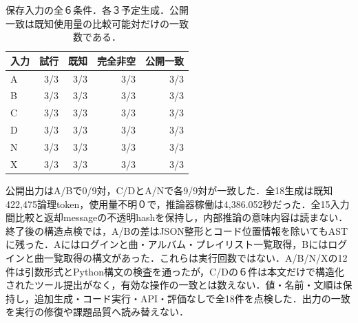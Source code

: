 \begin{table}[tb]
\centering\footnotesize\setlength{\tabcolsep}{3pt}
\caption{保存入力の全６条件．各３予定生成．公開一致は既知使用量の比較可能対だけの一致数である．}
\begin{tabular}{lrrrr}
入力 & 試行 & 既知 & 完全非空 & 公開一致 \\ \hline
A & 3/3 & 3/3 & 3/3 & 3/3 \\
B & 3/3 & 3/3 & 3/3 & 3/3 \\
C & 3/3 & 3/3 & 3/3 & 3/3 \\
D & 3/3 & 3/3 & 3/3 & 3/3 \\
N & 3/3 & 3/3 & 3/3 & 3/3 \\
X & 3/3 & 3/3 & 3/3 & 3/3 \\
\hline\end{tabular}
\end{table}
公開出力はA/Bで0/9対，C/DとA/Nで各9/9対が一致した．全18生成は既知422,475論理token，使用量不明０で，推論器稼働は4,386.052秒だった．全15入力間比較と返却messageの不透明hashを保持し，内部推論の意味内容は読まない．
終了後の構造点検では，A/Bの差はJSON整形とコード位置情報を除いてもASTに残った．Aにはログインと曲・アルバム・プレイリスト一覧取得，Bにはログインと曲一覧取得の構文があった．これらは実行回数ではない．A/B/N/Xの12件は引数形式とPython構文の検査を通ったが，C/Dの６件は本文だけで構造化されたツール提出がなく，有効な操作の一致とは数えない．値・名前・文順は保持し，追加生成・コード実行・API・評価なしで全18件を点検した．出力の一致を実行の修復や課題品質へ読み替えない．
